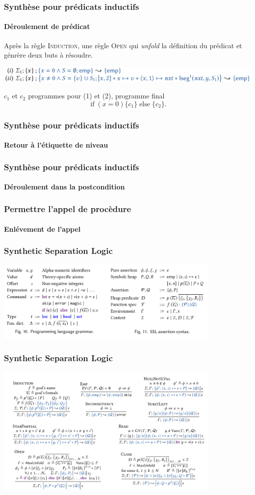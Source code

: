 \documentclass[french]{beamer}
\DeclareMathOperator{\If}{if}
\DeclareMathOperator{\Else}{else}
\begin{document}
\begin{frame}[fragile]
	\frametitle{Synthèse pour prédicats inductifs}
	\framesubtitle{Déroulement de prédicat}
   Après la règle \textsc{Induction}, une règle \textsc{Open} qui \textit{unfold}
   la définition du prédicat et génrère deux buts à résoudre.
        
   \includegraphics[width=\linewidth]{figures/unfold.png}
   
   $c_1$ et $c_2$ programmes pour (1) et (2), programme final
   \[
      \If (x = 0) \{c_1\} \Else \{ c_2 \}.
   \]
\end{frame}

\begin{frame}[fragile]
	\frametitle{Synthèse pour prédicats inductifs}
	\framesubtitle{Retour à l'étiquette de niveau}
\end{frame}
\begin{frame}[fragile]
	\frametitle{Synthèse pour prédicats inductifs}
	\framesubtitle{Déroulement dans la postcondition}
\end{frame}
\begin{frame}[fragile]
	\frametitle{Permettre l'appel de procèdure}
	\framesubtitle{Enlévement de l'appel}
\end{frame}
\begin{frame}[fragile]
	\frametitle{Synthetic Separation Logic}
	\includegraphics[width=11cm]{figures/syntax.png}
\end{frame}
\begin{frame}[fragile]
	\frametitle{Synthetic Separation Logic}
	\includegraphics[width=11cm]{figures/zoo1.png}
\end{frame}
\end{document}
